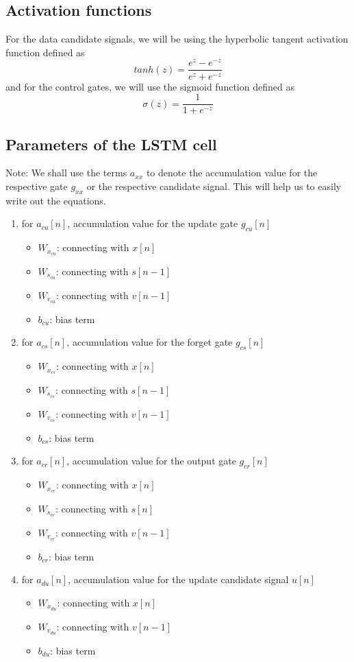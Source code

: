 \documentclass[12pt,letterpaper]{article}
\begin{document}
\subsection{Activation functions}
For the data candidate signals, we will be using the hyperbolic tangent activation function defined as
\[
tanh(z) = \frac{e^{z}-e^{-z}}{e^{z}+e^{-z}}\tag{33}
\]
and for the control gates, we will use the sigmoid function defined as
\[
\sigma(z) = \frac{1}{1+e^{-z}}\tag{34}
\]
\subsection{Parameters of the LSTM cell}
Note: We shall use the terms $a_{xx}$ to denote the accumulation value for the respective gate $g_{xx}$ or the respective candidate signal. This will help us to easily write out the equations.
\begin{enumerate}
    \item for $a_{cu}[n]$, accumulation value for the update gate $g_{cu}[n]$
    \begin{itemize}
        \item $W_{x_{cu}}$: connecting with $x[n]$ 
        \item $W_{s_{cu}}$: connecting with $s[n-1]$
        \item $W_{v_{cu}}$: connecting with $v[n-1]$
        \item $b_{cu}$:   bias term
    \end{itemize}
    \item for $a_{cs}[n]$, accumulation value for the forget gate $g_{cs}[n]$
    \begin{itemize}
        \item $W_{x_{cs}}$: connecting with $x[n]$ 
        \item $W_{s_{cs}}$: connecting with $s[n-1]$
        \item $W_{v_{cs}}$: connecting with $v[n-1]$
        \item $b_{cs}$:   bias term
    \end{itemize}
    \item for $a_{cr}[n]$, accumulation value for the output gate $g_{cr}[n]$
    \begin{itemize}
        \item $W_{x_{cr}}$: connecting with $x[n]$
        \item $W_{s_{cr}}$: connecting with $s[n]$
        \item $W_{v_{cr}}$: connecting with $v[n-1]$
        \item $b_{cr}$:   bias term
    \end{itemize}
    \item for $a_{du}[n]$, accumulation value for the update candidate signal $u[n]$
    \begin{itemize}
        \item $W_{x_{du}}$: connecting with $x[n]$
        \item $W_{v_{du}}$: connecting with $v[n-1]$
        \item $b_{du}$:   bias term
    \end{itemize}
\end{enumerate}
\end{document}
